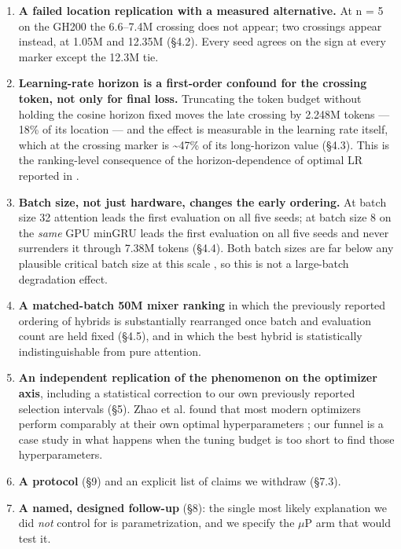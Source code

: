 \begin{enumerate}
\def\labelenumi{\arabic{enumi}.}
\tightlist
\item
  \textbf{A failed location replication with a measured alternative.} At n = 5 on the GH200 the
  6.6--7.4M crossing does not appear; two crossings appear instead, at 1.05M and 12.35M
  (\S4.2). Every seed agrees on the sign at every marker except the 12.3M tie.
\item
  \textbf{Learning-rate horizon is a first-order confound for the crossing token, not only for final
  loss.} Truncating the token budget without holding the cosine horizon fixed moves the late
  crossing by 2.248M tokens --- 18\% of its location --- and the effect is measurable in the learning
  rate itself, which at the crossing marker is \textasciitilde47\% of its long-horizon value (\S4.3). This is the
  ranking-level consequence of the horizon-dependence of optimal LR reported in \cite{ref31}.
\item
  \textbf{Batch size, not just hardware, changes the early ordering.} At batch size 32 attention
  leads the first evaluation on all five seeds; at batch size 8 on the \emph{same} GPU minGRU leads
  the first evaluation on all five seeds and never surrenders it through 7.38M tokens (\S4.4).
  Both batch sizes are far below any plausible critical batch size at this scale \cite{ref29}, so this is
  not a large-batch degradation effect.
\item
  \textbf{A matched-batch 50M mixer ranking} in which the previously reported ordering of hybrids is
  substantially rearranged once batch and evaluation count are held fixed (\S4.5), and in which
  the best hybrid is statistically indistinguishable from pure attention.
\item
  \textbf{An independent replication of the phenomenon on the optimizer axis}, including a
  statistical correction to our own previously reported selection intervals (\S5). Zhao et al.
  found that most modern optimizers perform comparably at their own optimal hyperparameters
  \cite{ref36}; our funnel is a case study in what happens when the tuning budget is too short to find
  those hyperparameters.
\item
  \textbf{A protocol} (\S9) and an explicit list of claims we withdraw (\S7.3).
\item
  \textbf{A named, designed follow-up} (\S8): the single most likely explanation we did \emph{not} control
  for is parametrization, and we specify the $\mu$P arm that would test it.
\end{enumerate}

